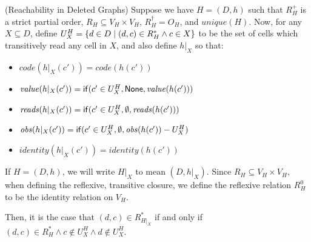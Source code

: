 \begin{lemma}{(Reachability in Deleted Graphs)}
Suppose we have $H = (D,h)$ such that $R^+_H$ is a strict partial
order, $R_H \subseteq V_H \times V_H$, $R^\dagger_H = O_H$, and
$\mathit{unique}(H)$.  Now, for any $X \subseteq D$, define $U^H_X =
\{{{d \in D}\;|\;{(d, c) \in R^*_H \land c \in X}}\}$ to be the set
of cells which transitively read any cell in $X$, and also define
$h|_X$ so that:
\begin{itemize}
\item $\mathit{code}(h|_X(c')) = \mathit{code}(h(c'))$
\item $\mathit{value}(h|_X(c')) = \mathsf{if}({c' \in U^H_X}, {\mathsf{None}}, {\mathit{value}(h(c'))})$
\item $\mathit{reads}(h|_X(c')) = \mathsf{if}({c' \in U^H_X}, {\emptyset}, {\mathit{reads}(h(c'))})$
\item $\mathit{obs}(h|_X(c')) = \mathsf{if}({c' \in U^H_X}, {\emptyset}, {\mathit{obs}(h(c')) - U^H_X})$
\item $\mathit{identity}(h|_X(c')) = \mathit{identity}(h(c'))$
\end{itemize}
If $H = (D,h)$, we will write $H|_X$ to mean $(D,h|_X)$. Since $R_H \subseteq V_H \times V_H$,
when defining the reflexive, transitive closure, we define the reflexive relation  $R^0_H$ to be the 
identity relation on $V_H$. 

Then, it is the case that $(d,c) \in R^*_{H|_X}$ if and only if $(d,c) \in R^*_H \land c \not\in U^H_X \land d \not\in U^H_X$. 
\end{lemma}

